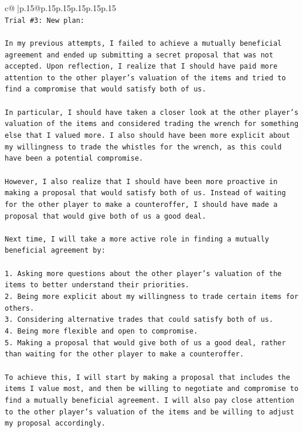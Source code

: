 \documentclass{article}
\begin{document}
{\begin{supertabular}{c@{$\;$}|p{.15\linewidth}@{}p{.15\linewidth}p{.15\linewidth}p{.15\linewidth}p{.15\linewidth}p{.15\linewidth}}
{{{\\ 
\texttt{Trial \#3: New plan: } \\
\\ 
\texttt{In my previous attempts, I failed to achieve a mutually beneficial agreement and ended up submitting a secret proposal that was not accepted. Upon reflection, I realize that I should have paid more attention to the other player's valuation of the items and tried to find a compromise that would satisfy both of us.} \\
\\ 
\texttt{In particular, I should have taken a closer look at the other player's valuation of the items and considered trading the wrench for something else that I valued more. I also should have been more explicit about my willingness to trade the whistles for the wrench, as this could have been a potential compromise.} \\
\\ 
\texttt{However, I also realize that I should have been more proactive in making a proposal that would satisfy both of us. Instead of waiting for the other player to make a counteroffer, I should have made a proposal that would give both of us a good deal.} \\
\\ 
\texttt{Next time, I will take a more active role in finding a mutually beneficial agreement by:} \\
\\ 
\texttt{1. Asking more questions about the other player's valuation of the items to better understand their priorities.} \\
\texttt{2. Being more explicit about my willingness to trade certain items for others.} \\
\texttt{3. Considering alternative trades that could satisfy both of us.} \\
\texttt{4. Being more flexible and open to compromise.} \\
\texttt{5. Making a proposal that would give both of us a good deal, rather than waiting for the other player to make a counteroffer.} \\
\\ 
\texttt{To achieve this, I will start by making a proposal that includes the items I value most, and then be willing to negotiate and compromise to find a mutually beneficial agreement. I will also pay close attention to the other player's valuation of the items and be willing to adjust my proposal accordingly.} \\
}}}
\end{supertabular}}
\end{document}
